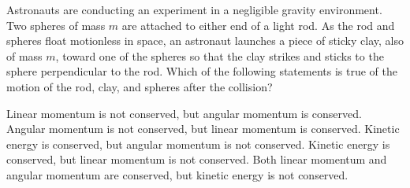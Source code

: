 \documentclass{../../oss-apphys-exam}
\begin{document}
\begin{multicols*}{2}
\begin{questions}
    
    \question Astronauts are conducting an experiment in a negligible gravity
    environment. Two spheres of mass $m$ are attached to either end of a light
    rod. As the rod and spheres float motionless in space, an astronaut
    launches a piece of sticky clay, also of mass $m$, toward one of the spheres
    so that the clay strikes and sticks to the sphere perpendicular to the rod.
    Which of the following statements is true of the motion of the rod, clay,
    and spheres after the collision?
    \begin{center}
    \end{center}
    \begin{choices}
      \choice Linear momentum is not conserved, but angular momentum is
      conserved.
      \choice Angular momentum is not conserved, but linear momentum is
      conserved.
      \choice Kinetic energy is conserved, but angular momentum is not
      conserved.
      \choice Kinetic energy is conserved, but linear momentum is not conserved.
      \choice Both linear momentum and angular momentum are conserved, but
      kinetic energy is not conserved.
    \end{choices}
    \vspace{.7in}


\end{questions}
\end{multicols*}
\end{document}
